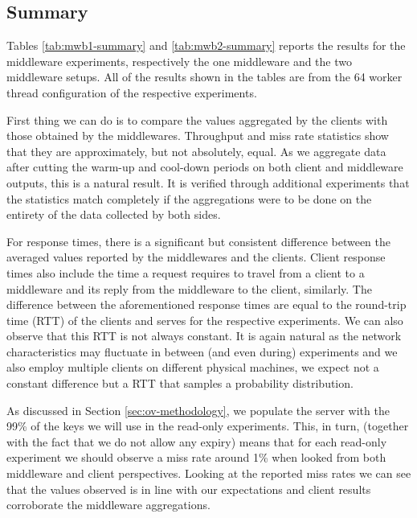 \documentclass[11pt,a4paper]{article}
\begin{document}
\subsection{Summary} \label{sec:mwb-summary}
Tables \ref{tab:mwb1-summary} and \ref{tab:mwb2-summary} reports the results for the middleware experiments, respectively the one middleware and the two middleware setups. All of the results shown in the tables are from the 64 worker thread configuration of the respective experiments.
\\
\par First thing we can do is to compare the values aggregated by the clients with those obtained by the middlewares. Throughput and miss rate statistics show that they are approximately, but not absolutely, equal. As we aggregate data after cutting the warm-up and cool-down periods on both client and middleware outputs, this is a natural result. It is verified through additional experiments that the statistics match completely if the aggregations were to be done on the entirety of the data collected by both sides.
\par For response times, there is a significant but consistent difference between the averaged values reported by the middlewares and the clients. Client response times also include the time a request requires to travel from a client to a middleware and its reply from the middleware to the client, similarly. The difference between the aforementioned response times are equal to the round-trip time (RTT) of the clients and serves for the respective experiments. We can also observe that this RTT is not always constant. It is again natural as the network characteristics may fluctuate in between (and even during) experiments and we also employ multiple clients on different physical machines, we expect not a constant difference but a RTT that samples a probability distribution.
\par As discussed in Section \ref{sec:ov-methodology}, we populate the server with the 99\% of the keys we will use in the read-only experiments. This, in turn, (together with the fact that we do not allow any expiry) means that for each read-only experiment we should observe a miss rate around 1\% when looked from both middleware and client perspectives. Looking at the reported miss rates we can see that the values observed is in line with our expectations and client results corroborate the middleware aggregations.
\\
\end{document}
